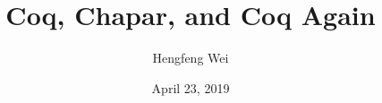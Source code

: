 \documentclass[]{beamer}
\title[Coq, Chapar, and Coq Again]{Coq, Chapar, and Coq Again}
\subtitle{}
\author[Hengfeng Wei]{Hengfeng Wei}
\institute{ICS, NJU}
\date{April 23, 2019}
\begin{document}
\maketitle





\thankyou{}
\end{document}
